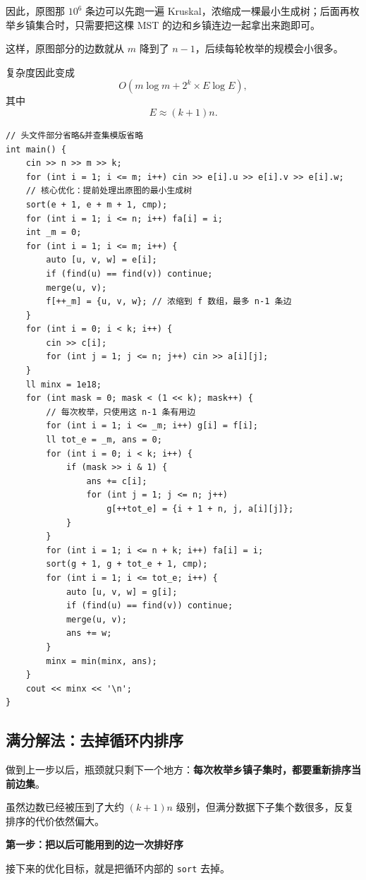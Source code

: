 \documentclass{book}
\newcommand{\code}[1]{\colorbox{codebg}{\texttt{#1}}}  %
\begin{document}
因此，原图那 $10^6$ 条边可以先跑一遍 Kruskal，浓缩成一棵最小生成树；后面再枚举乡镇集合时，只需要把这棵 MST 的边和乡镇连边一起拿出来跑即可。

这样，原图部分的边数就从 $m$ 降到了 $n-1$，后续每轮枚举的规模会小很多。

复杂度因此变成
\[
O(m\log m + 2^k \times E \log E),
\]
其中
\[
E \approx (k+1)n.
\]

\newpage
\begin{lstlisting}[style = code]
// 头文件部分省略&并查集模版省略
int main() {
    cin >> n >> m >> k;
    for (int i = 1; i <= m; i++) cin >> e[i].u >> e[i].v >> e[i].w;
    // 核心优化：提前处理出原图的最小生成树
    sort(e + 1, e + m + 1, cmp);
    for (int i = 1; i <= n; i++) fa[i] = i;
    int _m = 0;
    for (int i = 1; i <= m; i++) {
        auto [u, v, w] = e[i];
        if (find(u) == find(v)) continue;
        merge(u, v);
        f[++_m] = {u, v, w}; // 浓缩到 f 数组，最多 n-1 条边
    }
    for (int i = 0; i < k; i++) {
        cin >> c[i];
        for (int j = 1; j <= n; j++) cin >> a[i][j];
    }
    ll minx = 1e18;
    for (int mask = 0; mask < (1 << k); mask++) {
        // 每次枚举，只使用这 n-1 条有用边
        for (int i = 1; i <= _m; i++) g[i] = f[i];
        ll tot_e = _m, ans = 0;
        for (int i = 0; i < k; i++) {
            if (mask >> i & 1) { 
                ans += c[i];
                for (int j = 1; j <= n; j++)
                    g[++tot_e] = {i + 1 + n, j, a[i][j]};
            }
        }
        for (int i = 1; i <= n + k; i++) fa[i] = i;
        sort(g + 1, g + tot_e + 1, cmp);
        for (int i = 1; i <= tot_e; i++) {
            auto [u, v, w] = g[i];
            if (find(u) == find(v)) continue;
            merge(u, v);
            ans += w;
        }
        minx = min(minx, ans);
    }
    cout << minx << '\n';
}
\end{lstlisting}

\subsection{满分解法：去掉循环内排序}

做到上一步以后，瓶颈就只剩下一个地方：\textbf{每次枚举乡镇子集时，都要重新排序当前边集}。

虽然边数已经被压到了大约 $(k+1)n$ 级别，但满分数据下子集个数很多，反复排序的代价依然偏大。

\par\medskip
\noindent\textbf{第一步：把以后可能用到的边一次排好序}
\par\medskip
接下来的优化目标，就是把循环内部的 \code{sort} 去掉。
\end{document}
